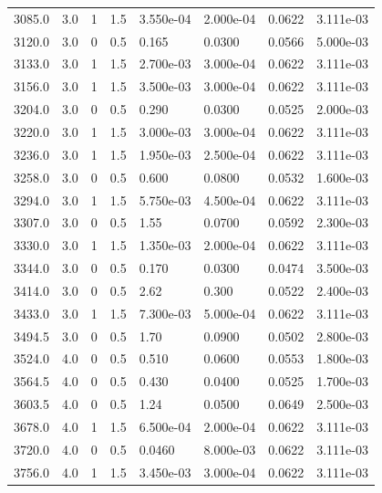 \documentclass[preview]{standalone}
\begin{document}
{{{\begin{tabular}{L{1.2cm}C{1.2cm} C{0.3cm}C{0.5cm} C{1.4cm}C{1.4cm} C{1.4cm}C{1.4cm}}
  3085.0  &   3.0  & 1     & 1.5 &  3.550e-04  & 2.000e-04  & 0.0622 &  3.111e-03   \\ 
  3120.0  &   3.0  & 0     & 0.5 &  0.165  & 0.0300  & 0.0566 &  5.000e-03   \\ 
  3133.0  &   3.0  & 1     & 1.5 &  2.700e-03  & 3.000e-04  & 0.0622 &  3.111e-03   \\ 
  3156.0  &   3.0  & 1     & 1.5 &  3.500e-03  & 3.000e-04  & 0.0622 &  3.111e-03   \\ 
  3204.0  &   3.0  & 0     & 0.5 &  0.290  & 0.0300  & 0.0525 &  2.000e-03   \\ 
  3220.0  &   3.0  & 1     & 1.5 &  3.000e-03  & 3.000e-04  & 0.0622 &  3.111e-03   \\ 
  3236.0  &   3.0  & 1     & 1.5 &  1.950e-03  & 2.500e-04  & 0.0622 &  3.111e-03   \\ 
  3258.0  &   3.0  & 0     & 0.5 &  0.600  & 0.0800  & 0.0532 &  1.600e-03   \\ 
  3294.0  &   3.0  & 1     & 1.5 &  5.750e-03  & 4.500e-04  & 0.0622 &  3.111e-03   \\ 
  3307.0  &   3.0  & 0     & 0.5 &  1.55  & 0.0700  & 0.0592 &  2.300e-03   \\ 
  3330.0  &   3.0  & 1     & 1.5 &  1.350e-03  & 2.000e-04  & 0.0622 &  3.111e-03   \\ 
  3344.0  &   3.0  & 0     & 0.5 &  0.170  & 0.0300  & 0.0474 &  3.500e-03   \\ 
  3414.0  &   3.0  & 0     & 0.5 &  2.62  & 0.300  & 0.0522 &  2.400e-03   \\ 
  3433.0  &   3.0  & 1     & 1.5 &  7.300e-03  & 5.000e-04  & 0.0622 &  3.111e-03   \\ 
  3494.5  &   3.0  & 0     & 0.5 &  1.70  & 0.0900  & 0.0502 &  2.800e-03   \\ 
  3524.0  &   4.0  & 0     & 0.5 &  0.510  & 0.0600  & 0.0553 &  1.800e-03   \\ 
  3564.5  &   4.0  & 0     & 0.5 &  0.430  & 0.0400  & 0.0525 &  1.700e-03   \\ 
  3603.5  &   4.0  & 0     & 0.5 &  1.24  & 0.0500  & 0.0649 &  2.500e-03   \\ 
  3678.0  &   4.0  & 1     & 1.5 &  6.500e-04  & 2.000e-04  & 0.0622 &  3.111e-03   \\ 
  3720.0  &   4.0  & 0     & 0.5 &  0.0460  & 8.000e-03  & 0.0622 &  3.111e-03   \\ 
  3756.0  &   4.0  & 1     & 1.5 &  3.450e-03  & 3.000e-04  & 0.0622 &  3.111e-03   \\ 

\end{tabular}}}}
\end{document}
